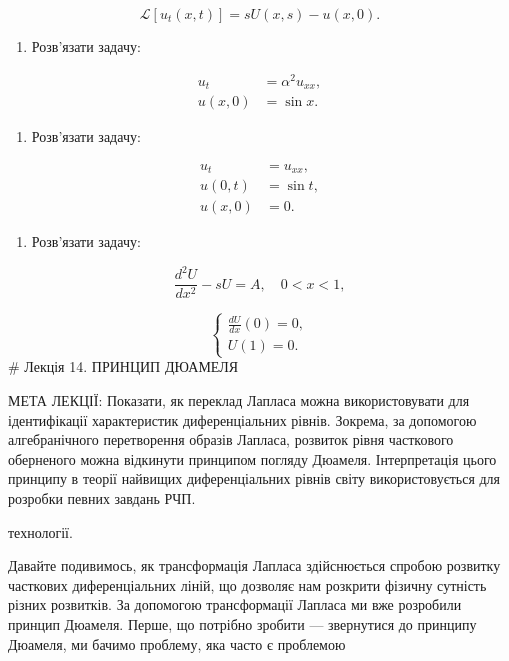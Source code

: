 \[
\mathscr{L}[u_t(x,t)] = sU(x,s) - u(x,0).
\]

\begin{enumerate}
\def\labelenumi{\arabic{enumi}.}
\setcounter{enumi}{1}
\tightlist
\item
  Розв'язати задачу:
\end{enumerate}

\[
\begin{aligned}
u_t &= \alpha^2 u_{xx}, \\
u(x,0) &= \sin x.
\end{aligned}
\]

\begin{enumerate}
\def\labelenumi{\arabic{enumi}.}
\setcounter{enumi}{2}
\tightlist
\item
  Розв'язати задачу:
\end{enumerate}

\[
\begin{aligned}
u_t &= u_{xx}, \\
u(0,t) &= \sin t, \\
u(x,0) &= 0.
\end{aligned}
\]

\begin{enumerate}
\def\labelenumi{\arabic{enumi}.}
\setcounter{enumi}{3}
\tightlist
\item
  Розв'язати задачу:
\end{enumerate}

\[
\frac{d^2U}{dx^2} - sU = A, \quad 0 < x < 1,
\]

\[
\begin{cases}
\frac{dU}{dx}(0) = 0, \\
U(1) = 0.
\end{cases}
\] \# Лекція 14. ПРИНЦИП ДЮАМЕЛЯ

МЕТА ЛЕКЦІЇ: Показати, як переклад Лапласа можна використовувати для ідентифікації характеристик диференціальних рівнів. Зокрема, за допомогою алгебранічного перетворення образів Лапласа, розвиток рівня часткового оберненого можна відкинути принципом погляду Дюамеля. Інтерпретація цього принципу в теорії найвищих диференціальних рівнів світу використовується для розробки певних завдань РЧП.

технології.

Давайте подивимось, як трансформація Лапласа здійснюється спробою розвитку часткових диференціальних ліній, що дозволяє нам розкрити фізичну сутність різних розвитків. За допомогою трансформації Лапласа ми вже розробили принцип Дюамеля. Перше, що потрібно зробити --- звернутися до принципу Дюамеля, ми бачимо проблему, яка часто є проблемою

